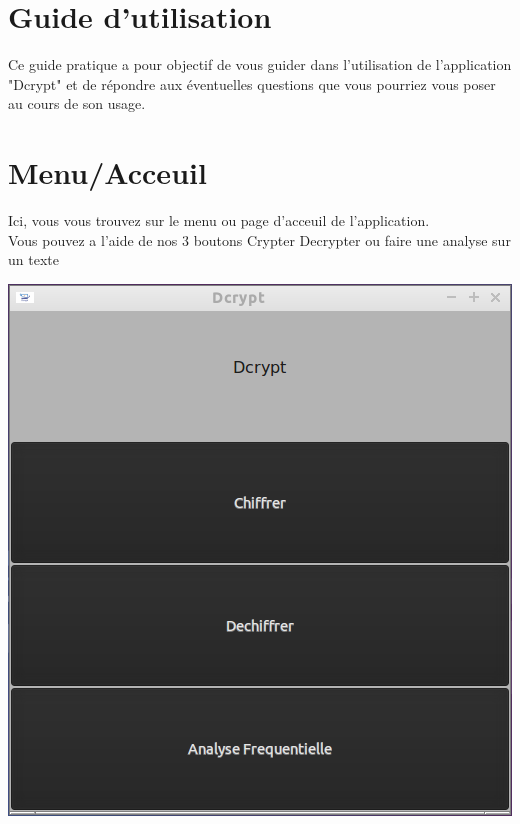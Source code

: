 \documentclass[a4]{article}
\begin{document}
	\section{Guide d'utilisation}
	
	
	Ce guide pratique a pour objectif de vous guider dans l’utilisation de l’application
"Dcrypt" et de répondre aux éventuelles questions que vous pourriez vous poser au
cours de son usage. 
	
	

	\section{Menu/Acceuil}
			Ici, vous vous trouvez sur le menu ou page d'acceuil de l'application. \\
			Vous pouvez a l'aide de nos 3 boutons Crypter Decrypter ou faire une analyse sur un texte  \\
			\begin{center}\includegraphics[scale=0.4]{1.png}\end{center}
			
			
			
\end{document}
